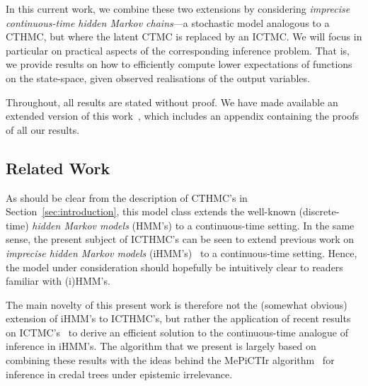 \documentclass[twoside,11pt]{article}
\begin{document}
In this current work, we combine these two extensions by considering \emph{imprecise continuous-time hidden Markov chains}---a stochastic model analogous to a CTHMC, but where the latent CTMC is replaced by an ICTMC. We will focus in particular on practical aspects of the corresponding inference problem. That is, we provide results on how to efficiently compute lower expectations of functions on the state-space, given observed realisations of the output variables. 

Throughout, all results are stated without proof. We have made available an extended version of this work~\citep{krak2017icthmc}, which includes an appendix containing the proofs of all our results.


\subsection{Related Work}\label{sec:related}

As should be clear from the description of CTHMC's in Section~\ref{sec:introduction}, this model class extends the well-known (discrete-time) \emph{hidden Markov models} (HMM's) to a continuous-time setting. In the same sense, the present subject of ICTHMC's can be seen to extend previous work on \emph{imprecise hidden Markov models} (iHMM's)~\citep{deCooman:2010gd} to a continuous-time setting. Hence, the model  under consideration should hopefully be intuitively clear to readers familiar with (i)HMM's. 

The main novelty of this present work is therefore not the (somewhat obvious) extension of iHMM's to ICTHMC's, but rather the application of recent results on ICTMC's~\citep{krak2016ictmc} to derive an efficient solution to the continuous-time analogue of inference in iHMM's. The algorithm that we present is largely based on combining these results with the ideas behind the MePiCTIr algorithm~\citep{deCooman:2010gd} for inference in credal trees under epistemic irrelevance.
\end{document}
